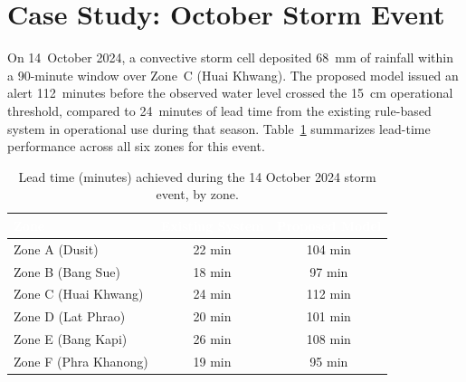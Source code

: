 \section{Case Study: October Storm Event}
On 14~October 2024, a convective storm cell deposited 68~mm of rainfall within a 90-minute window over Zone~C (Huai Khwang). The proposed model issued an alert 112~minutes before the observed water level crossed the 15~cm operational threshold, compared to 24~minutes of lead time from the existing rule-based system in operational use during that season. Table~\ref{tab:casestudy} summarizes lead-time performance across all six zones for this event.

\begin{table}[htbp]
\centering
\caption{Lead time (minutes) achieved during the 14 October 2024 storm event, by zone.}
\label{tab:casestudy}
\renewcommand{\arraystretch}{1.3}
\begin{tabular}{@{}l c c@{}}
\toprule
\rowcolor{chulapink}
\textcolor{white}{\textbf{Zone}} & \textcolor{white}{\textbf{Existing System}} & \textcolor{white}{\textbf{Proposed Model}} \\
\midrule
Zone A (Dusit) & 22 min & 104 min \\
Zone B (Bang Sue) & 18 min & 97 min \\
Zone C (Huai Khwang) & 24 min & 112 min \\
Zone D (Lat Phrao) & 20 min & 101 min \\
Zone E (Bang Kapi) & 26 min & 108 min \\
Zone F (Phra Khanong) & 19 min & 95 min \\
\bottomrule
\end{tabular}
\end{table}
